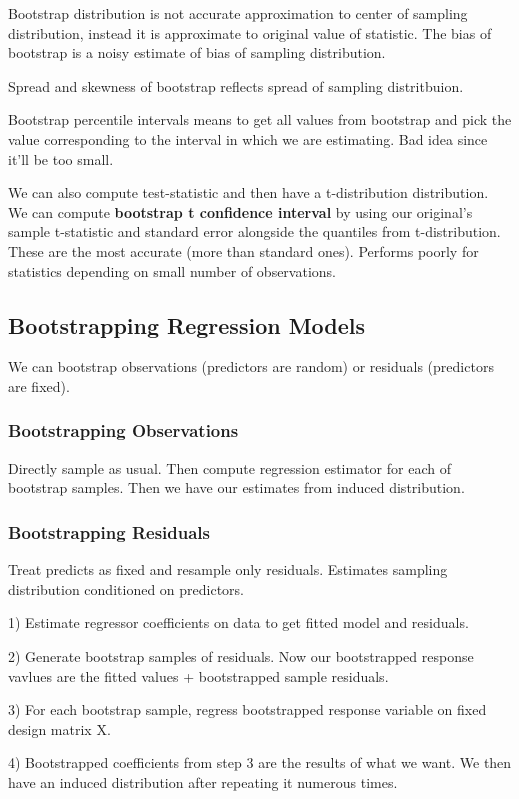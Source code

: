 \documentclass[11pt, oneside]{article}
\theoremstyle{definition}
\begin{document}
Bootstrap distribution is not accurate approximation to center of sampling distribution, instead it is approximate to original value of statistic. The bias of bootstrap is a noisy estimate of bias of sampling distribution.

Spread and skewness of bootstrap reflects spread of sampling distritbuion.

Bootstrap percentile intervals means to get all values from bootstrap and pick the value corresponding to the interval in which we are estimating. Bad idea since it'll be too small.

We can also compute test-statistic and then have a t-distribution distribution. We can compute \textbf{bootstrap t confidence interval} by using our original's sample t-statistic and standard error alongside  the quantiles from t-distribution. These are the most accurate (more than standard ones). Performs poorly for statistics depending on small number of observations.

\subsection{Bootstrapping Regression Models}
We can bootstrap observations (predictors are random) or residuals (predictors are fixed).
\subsubsection{Bootstrapping Observations}
Directly sample as usual. Then compute regression estimator for each of bootstrap samples. Then we have our estimates from induced distribution.
\subsubsection{Bootstrapping Residuals}
Treat predicts as fixed and resample only residuals. Estimates sampling distribution conditioned on predictors.

1) Estimate regressor coefficients on data to get fitted model and residuals.

2) Generate bootstrap samples of residuals. Now our bootstrapped response vavlues are the fitted values + bootstrapped sample residuals.

3) For each bootstrap sample, regress bootstrapped response variable on fixed design matrix X.

4) Bootstrapped coefficients from step 3 are the results of what we want. We then have an induced distribution after repeating it numerous times.
\end{document}
